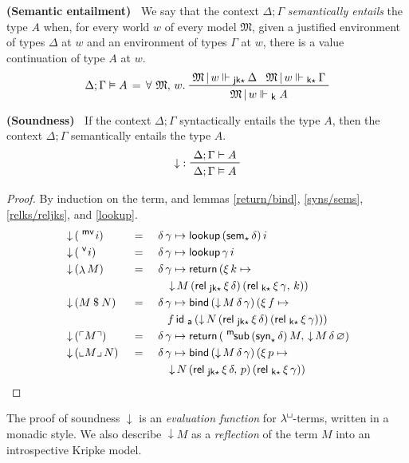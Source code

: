 \documentclass{entcs}
\numberwithin{equation}{thm}
\newcommand{\lambdabox}{\lambda^{\mkern-1mu\sq\mkern-2mu}}
\newcommand{\tsf}[1]{\textsf{\upshape{#1}}}
\newcommand{\stsf}[1]{\smash{\tsf{\small{#1}}}}
\renewcommand{\:}{\mathrel{:}}
\newcommand{\tyrule}[1]{\prftree[l]{${#1} \:\,$}}
\let\oldforall\forall
\renewcommand{\forall}{\oldforall\,}
\newcommand{\0}{\varnothing}
\newcommand{\sq}{\Box}
\renewcommand{\e}{\mathrel{\vdash}}
\newcommand{\mvar}{\operatorname{^{\stsf{mv}\mkern-2mu}}}
\newcommand{\var}{\operatorname{^{\stsf{v}\mkern-2mu}}}
\newcommand{\lam}{\operatorname{\lambda}}
\newcommand{\app}{\mathbin{\$}}
\newcommand{\quo}[1]{\mathopen{\ulcorner}{#1}\mathclose{\urcorner}}
\newcommand{\unq}[1]{\mathopen{\llcorner}{#1}\mathclose{\lrcorner}\,}
\newcommand{\msub}{\operatorname{^{\stsf{m}\mkern-2mu}\tsf{sub}}}
\newcommand{\M}{\mathfrak{M}}
\newcommand{\Mover}{\M\,|\,}
\newcommand{\ida}{\operatorname{\tsf{id}_{\stsf{a}}}}
\newcommand{\eek}{\mathrel{\Vdash_{\stsf{k}}}}
\newcommand{\eeks}{\mathrel{\Vdash_{\stsf{k}\star\mkern-2mu}}}
\newcommand{\eejks}{\mathrel{\Vdash_{\stsf{jk}\star\mkern-2mu}}}
\newcommand{\syns}{\operatorname{\tsf{syn}_{\star}}}
\newcommand{\sems}{\operatorname{\tsf{sem}_{\star}}}
\newcommand{\eeq}{\mathrel{\vDash}}
\newcommand{\relks}{\operatorname{\tsf{rel}_{\stsf{k}\star}}}
\newcommand{\reljks}{\operatorname{\tsf{rel}_{\stsf{jk}\star}}}
\newcommand{\return}{\operatorname{\tsf{return}}}
\newcommand{\bind}{\operatorname{\tsf{bind}}}
\newcommand{\lookup}{\operatorname{\tsf{lookup}}}
\newcommand{\reflect}{\operatorname{\downarrow}}
\begin{document}
\begin{definition}
  \textbf{(Semantic entailment)\ }
  \label{eeq}
  We say that the context $\Delta; \Gamma$ \emph{semantically entails} the type $A$ when, for every world $w$ of every model $\M$, given a justified environment of types $\Delta$ at $w$ and an environment of types $\Gamma$ at $w$, there is a value continuation of type $A$ at $w$.
  \begin{gather*}
    \Delta; \Gamma \eeq A \,=\, \forall \M,\,w.\ \raisebox{-8pt}{$\prftree{\Mover w \eejks \Delta}{\Mover w \eeks \Gamma}{\Mover w \eek A}$}
  \end{gather*}
\end{definition}

\begin{theorem}
  \normalshape
  \textbf{(Soundness)\ }
  \label{reflect}
  If the context $\Delta; \Gamma$ syntactically entails the type $A$, then the context $\Delta; \Gamma$ semantically entails the type $A$.
  \begin{gather*}
    \tyrule{\reflect}{\Delta; \Gamma \e A}{\Delta; \Gamma \eeq A}
  \end{gather*}
  \itshape
  \pagebreak %
  \begin{proof}
    \normalshape
    By induction on the term, and lemmas \ref{return/bind}, \ref{syns/sems}, \ref{relks/reljks}, and \ref{lookup}.
    \begin{alignat}{3}
      \label{reflect.mvar} & \reflect\, (\mvar i)    \,&&=\, &&\,\delta\, \gamma \mapsto \lookup\, (\sems \delta)\, i\\
      \label{reflect.var}  & \reflect\, (\var i)     \,&&=\, &&\,\delta\, \gamma \mapsto \lookup \gamma\, i\\
      \label{reflect.lam}  & \reflect\, (\lam M)     \,&&=\, &&\,\delta\, \gamma \mapsto \return\, (\xi\,k \mapsto\\
      \nonumber            & && && \quad \reflect M\, (\reljks \xi\, \delta)\, (\relks \xi\, \gamma,\, k))\\
      \label{reflect.app}  & \reflect\, (M \app N) \,&&=\, &&\,\delta\, \gamma \mapsto \bind\, (\reflect M\, \delta\, \gamma)\, (\xi\,f \mapsto\\
      \nonumber            & && && \quad f \ida\, (\reflect N\, (\reljks \xi\, \delta)\, (\relks \xi\, \gamma)))\\
      \label{reflect.quo}  & \reflect\, (\quo{M})   \,&&=\, &&\,\delta\, \gamma \mapsto \return\, (\msub\, (\syns \delta)\, M,\, \reflect M\, \delta\, \0)\\
      \label{reflect.unq}  & \reflect\, (\unq{M} N) \,&&=\, &&\,\delta\, \gamma \mapsto \bind\, (\reflect M\, \delta\, \gamma)\, (\xi\,p \mapsto\\
      \nonumber            & && && \quad \reflect N\, (\reljks \xi\, \delta,\, p)\, (\relks \xi\, \gamma))
    \end{alignat}
  \end{proof}
\end{theorem}
\noindent
The proof of soundness $\reflect$ is an \emph{evaluation function} for $\lambdabox$-terms, written in a monadic style.
We also describe $\reflect M$ as a \emph{reflection} of the term $M$ into an introspective Kripke model.
\end{document}
